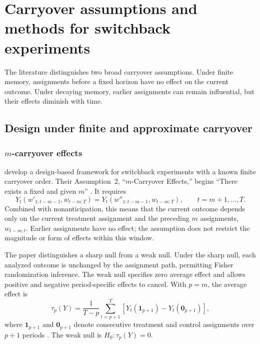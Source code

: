 \section{Carryover assumptions and methods for switchback experiments}\label{sec:carryover}
The literature distinguishes two broad carryover assumptions. Under finite memory, assignments before a fixed horizon have no effect on the current outcome. Under decaying memory, earlier assignments can remain influential, but their effects diminish with time.
\subsection{Design under finite and approximate carryover}\label{sec:finite}

\subsubsection{$m$-carryover effects}

\citet{bojinov2023} develop a design-based framework for switchback experiments with a known finite carryover order. Their Assumption~2, ``$m$-Carryover Effects,'' begins ``There exists a fixed and given $m$'' \citep[Assumption~2, p.~3762; PDF p.~4]{bojinov2023}. It requires
\begin{equation}\label{eq:finite-memory-original}
Y_t(w'_{1:t-m-1},w_{t-m:T})
=Y_t(w''_{1:t-m-1},w_{t-m:T}),
\qquad t=m+1,\ldots,T.
\end{equation}
Combined with nonanticipation, this means that the current outcome depends only on the current treatment assignment and the preceding $m$ assignments, $w_{t-m:t}$. Earlier assignments have no effect; the assumption does not restrict the magnitude or form of effects within this window.

The paper distinguishes a sharp null from a weak null. Under the sharp null, each analyzed outcome is unchanged by the assignment path, permitting Fisher randomization inference. The weak null specifies zero average effect and allows positive and negative period-specific effects to cancel. With $p=m$, the average effect is
\begin{equation}\label{eq:finite-memory-estimand}
\tau_p(Y)=\frac{1}{T-p}\sum_{t=p+1}^{T}
\left[Y_t(\mathbf{1}_{p+1})-Y_t(\mathbf{0}_{p+1})\right],
\end{equation}
where $\mathbf{1}_{p+1}$ and $\mathbf{0}_{p+1}$ denote consecutive treatment and control assignments over $p+1$ periods \citep[Eq.~(1), p.~3762]{bojinov2023}. The weak null is $H_0:\tau_p(Y)=0$.

